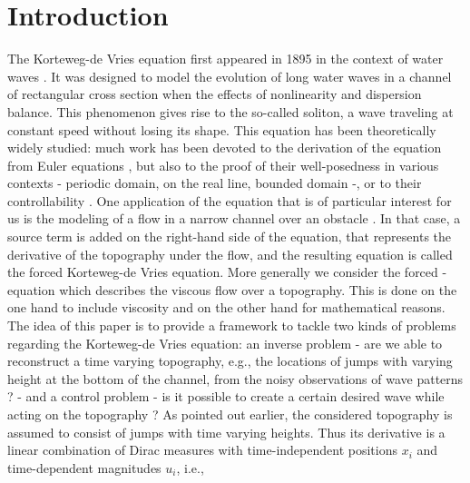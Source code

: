 
\section{Introduction}

The Korteweg-de Vries equation first appeared in 1895 in the context of water waves \cite{korteweg1895xli}. It was designed to model the evolution of long water waves in a channel of rectangular cross section when the effects of nonlinearity and dispersion balance. This phenomenon gives rise to the so-called soliton, a wave traveling at constant speed without losing its shape. This equation has been theoretically widely studied: much work has been devoted to the derivation of the equation from Euler equations \cite{shen1992forced,constantin2008,su2003korteweg}, but also to the proof of their well-posedness in various contexts \cite{miura1976korteweg,kenig1993,bourgain1997periodic} - periodic domain, on the real line, bounded domain -, or to their controllability \cite{rosier1997exact,glass2008some,coron2003exact,chapouly2009global}.
One application of the \KdV equation that is of particular interest for us is the modeling of a flow in a narrow channel over an obstacle \cite{milewski2004forced,shen1992forced,shen1996accuracy}. %
In that case, a source term is added on the right-hand side of the \KdV equation, that represents the derivative of the topography under the flow, and the resulting equation is called the forced Korteweg-de Vries equation. More generally we consider the forced \KdVB-equation which describes the viscous flow over a topography. This is done on the one hand to include viscosity and on the other hand for mathematical reasons.      %
The idea of this paper is to provide a framework to tackle two kinds of problems regarding the Korteweg-de Vries equation: an inverse problem - are we able to reconstruct a time varying topography, e.g., the locations of jumps with varying height at the bottom of the channel, from the noisy observations of wave patterns ? -  and a control problem - is it possible to create a certain desired wave while acting on the topography ? As pointed out earlier, the considered topography is assumed to consist of jumps with time varying heights. Thus its derivative is a linear combination of Dirac measures with time-independent positions $x_i$ and time-dependent magnitudes $u_i$, i.e.,

